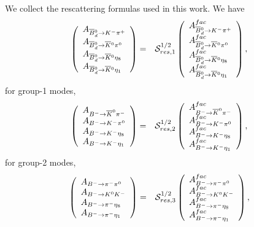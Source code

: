 \documentclass[aps,preprint,floats,epsf,epsfig,nofootinbib,letter]{revtex4}
\newcommand{\ov}{\overline}
\newcommand{\Sc}{{\cal S}}
\begin{document}
We collect the rescattering formulas used in this work.
We have
\begin{eqnarray}
\left(
\begin{array}{l}
 A_{\ov B {}^0_{d}\to K^-\pi^+}\\
 A_{\ov B {}^0_{d}\to \ov K {}^0 \pi^0}\\
 A_{\ov B {}^0_{d}\to \ov K {}^0 \eta_8}\\
 A_{\ov B {}^0_{d}\to \ov K {}^0 \eta_1}
\end{array}
\right)
 &=& \Sc_{res,1}^{1/2}
 \left(
\begin{array}{l}
 A^{fac}_{\ov B {}^0_{d}\to K^-\pi^+}\\
 A^{fac}_{\ov B {}^0_{d}\to \ov K {}^0 \pi^0}\\
 A^{fac}_{\ov B {}^0_{d}\to \ov K {}^0 \eta_8}\\
 A^{fac}_{\ov B {}^0_{d}\to \ov K {}^0 \eta_1}
\end{array}
\right),
 \label{eq:FSIB0Kpi}
\end{eqnarray}
for group-1 modes,
\begin{eqnarray}
\left(
\begin{array}{l}
 A_{B^-\to \ov K^0\pi^-}\\
 A_{B^-\to K^- \pi^0}\\
 A_{B^-\to K^- \eta_8}\\
 A_{B^-\to K^- \eta_1}
\end{array}
\right)
 &=& \Sc_{res,2}^{1/2}
 \left(
\begin{array}{l}
 A^{fac}_{B^-\to \ov K^0\pi^-}\\
 A^{fac}_{B^-\to K^- \pi^0}\\
 A^{fac}_{B^-\to K^- \eta_8}\\
 A^{fac}_{B^-\to K^- \eta_1}
\end{array}
\right),
 \label{eq:FSIBKpi0}
\end{eqnarray}
for group-2 modes,
\begin{eqnarray}
\left(
\begin{array}{l}
 A_{B^-\to \pi^-\pi^0}\\
 A_{B^-\to K^0 K^-}\\
 A_{B^-\to \pi^- \eta_8}\\
 A_{B^-\to \pi^- \eta_1}
\end{array}
\right)
 &=& \Sc_{res,3}^{1/2}
 \left(
\begin{array}{l}
 A^{fac}_{B^-\to \pi^-\pi^0}\\
 A^{fac}_{B^-\to K^0 K^-}\\
 A^{fac}_{B^-\to \pi^- \eta_8}\\
 A^{fac}_{B^-\to \pi^- \eta_1}
\end{array}
\right),
 \label{eq:FSIBpipi0}
\end{eqnarray}
\end{document}
